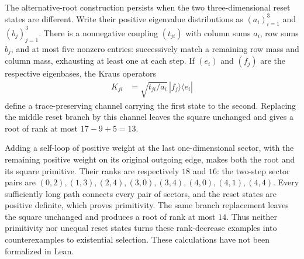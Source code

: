 \documentclass{article}
\begin{document}
The alternative-root construction persists when the two three-dimensional
reset states are different. Write their positive eigenvalue distributions as
$(a_i)_{i=1}^3$ and $(b_j)_{j=1}^3$. There is a nonnegative coupling
$(t_{ji})$ with column sums $a_i$, row sums $b_j$, and at most five nonzero
entries: successively match a remaining row mass and column mass, exhausting
at least one at each step. If $(e_i)$ and $(f_j)$ are the respective
eigenbases, the Kraus operators
\begin{align}
  K_{ji}&=\sqrt{t_{ji}/a_i}\,|f_j\rangle\langle e_i|
  \label{eq:dccsp17_reset_state_coupling}
\end{align}
define a trace-preserving channel carrying the first state to the second.
Replacing the middle reset branch by this channel leaves the square
unchanged and gives a root of rank at most $17-9+5=13$.

Adding a self-loop of positive weight at the last one-dimensional sector,
with the remaining positive weight on its original outgoing edge, makes
both the root and its square primitive. Their ranks are respectively
$18$ and $16$: the two-step sector pairs are
$(0,2),(1,3),(2,4),(3,0),(3,4),(4,0),(4,1),(4,4)$.
Every sufficiently long path connects every pair of sectors, and the reset
states are positive definite, which proves primitivity. The same branch
replacement leaves the square unchanged and produces a root of rank at
most $14$. Thus neither primitivity nor unequal reset states turns these
rank-decrease examples into counterexamples to existential selection.
These calculations have not been formalized in Lean.
\end{document}
